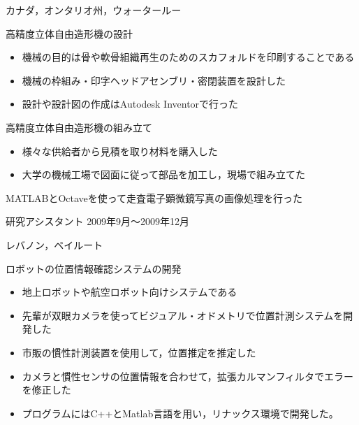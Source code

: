\documentclass[10pt, a4paper]{article}
\begin{document}
\begin{outerlist}
\vspace{-2\baselineskip}
\hfill カナダ，オンタリオ州，ウォータールー
  \begin{innerlist}
  \item 高精度立体自由造形機の設計
    \begin{itemize}
      \item 機械の目的は骨や軟骨組織再生のためのスカフォルドを印刷することである
      \item 機械の枠組み・印字ヘッドアセンブリ・密閉装置を設計した
      \item 設計や設計図の作成はAutodesk Inventorで行った
    \end{itemize}
  \item 高精度立体自由造形機の組み立て
    \begin{itemize}
      \item 様々な供給者から見積を取り材料を購入した
      \item 大学の機械工場で図面に従って部品を加工し，現場で組み立てた
    \end{itemize}
  \item MATLABとOctaveを使って走査電子顕微鏡写真の画像処理を行った
  \end{innerlist}

\item[\href{http://www.aub.edu.lb/fea/me/research_labs/cvl/Pages/home.aspx}{\parbox[t]{3cm}{\raggedleft ベイルート・\\アメリカン大学\\移動ロボット研究室}}]{研究アシスタント} \hfill {2009年9月〜2009年12月}

\vspace{-2\baselineskip}
\hfill レバノン，ベイルート
  \begin{innerlist}
  \item ロボットの位置情報確認システムの開発
    \begin{itemize}
      \item 地上ロボットや航空ロボット向けシステムである
      \item 先輩が双眼カメラを使ってビジュアル・オドメトリで位置計測システムを開発した
      \item 市販の慣性計測装置を使用して，位置推定を推定した
      \item カメラと慣性センサの位置情報を合わせて，拡張カルマンフィルタでエラーを修正した
      \item プログラムにはC++とMatlab言語を用い，リナックス環境で開発した。
    \end{itemize}
  \end{innerlist}


\end{outerlist}
\end{document}
